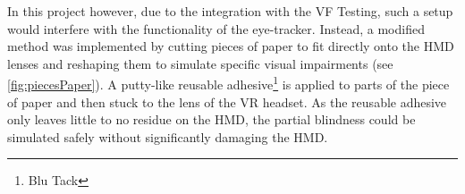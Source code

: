 \documentclass{l4proj}
\begin{document}

In this project however, due to the integration with the VF Testing, such a setup would interfere with the functionality of the eye-tracker. Instead, a modified method was implemented by cutting pieces of paper to fit directly onto the HMD lenses and reshaping them to simulate specific visual impairments (see \ref{fig:piecesPaper}). A putty-like reusable adhesive\footnote{Blu Tack} is applied to parts of the piece of paper and then stuck to the lens of the VR headset. As the reusable adhesive only leaves little to no residue on the HMD, the partial blindness could be simulated safely without significantly damaging the HMD. 
\end{document}
